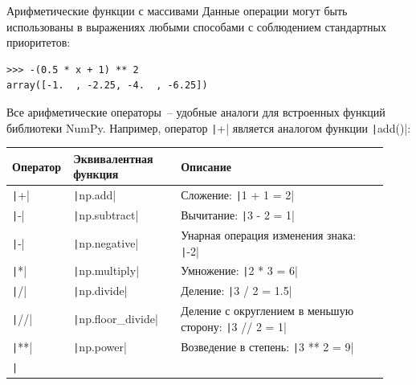 \documentclass[aspectratio=169, mathserif]{beamer}%
\begin{document}
\begin{frame}[fragile]{Арифметические функции с массивами}
\scriptsize
Данные операции могут быть использованы в выражениях любыми способами с соблюдением стандартных приоритетов:

\begin{verbatim}
>>> -(0.5 * x + 1) ** 2
array([-1.  , -2.25, -4.  , -6.25])
\end{verbatim}

Все арифметические операторы~-- удобные аналоги для встроенных функций библиотеки NumPy. Например, оператор \texttt|+| является аналогом функции \texttt|add()|:

\begin{table}[h!]
\label{tab:арифм.опер.np}
\begin{tabular*}{\linewidth}{p{0.11\linewidth}p{0.28\linewidth}p{0.54\linewidth}}
\hline
{Оператор} & {Эквивалентная функция} & {Описание} \\
\hline

\texttt|+| & \texttt|np.add| & Сложение: \texttt|1 + 1 = 2| \\

\texttt|-| & \texttt|np.subtract| & Вычитание: \texttt|3 - 2 = 1| \\

\texttt|-| & \texttt|np.negative| & Унарная операция изменения знака: \texttt|-2| \\

\texttt|*| & \texttt|np.multiply| & Умножение: \texttt|2 * 3 = 6| \\

\texttt|/| & \texttt|np.divide| & Деление: \texttt|3 / 2 = 1.5| \\

\texttt|//| & \texttt|np.floor_divide| & Деление с округлением в меньшую сторону: \texttt|3 // 2 = 1| \\

\texttt|**| & \texttt|np.power| & Возведение в степень: \texttt|3 ** 2 = 9| \\

\texttt|%
\hline
\end{tabular*}
\end{table}
\vfil
\end{frame}
\end{document}
